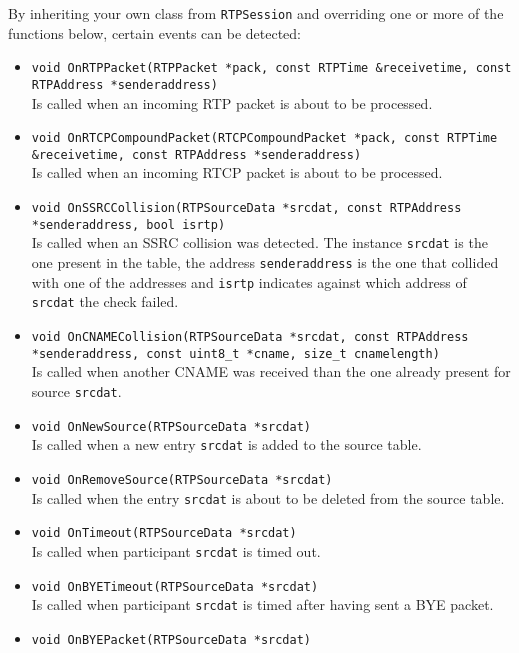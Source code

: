 \documentclass[12pt,a4paper]{article}
\begin{document}
				By inheriting your own class from {\tt RTPSession} and overriding
				one or more of the functions below, certain events can be detected:
				\begin{itemize}
					\item {\tt void OnRTPPacket(RTPPacket *pack, const RTPTime \&receivetime,
					                                    const RTPAddress *senderaddress)}\\
						Is called when an incoming RTP packet is about to be processed.
					\item {\tt void OnRTCPCompoundPacket(RTCPCompoundPacket *pack, const RTPTime \&receivetime,
					                                             const RTPAddress *senderaddress)}\\
						Is called when an incoming RTCP packet is about to be processed.
					\item {\tt void OnSSRCCollision(RTPSourceData *srcdat, const RTPAddress *senderaddress, bool isrtp)}\\
						Is called when an SSRC collision was detected. The instance
						{\tt srcdat} is the one present in the table, the address
						{\tt senderaddress} is the one that collided with one of the
						addresses and {\tt isrtp} indicates against which address of
						{\tt srcdat} the check failed.
					\item {\tt void OnCNAMECollision(RTPSourceData *srcdat, const RTPAddress *senderaddress,
					                                         const uint8\_t *cname, size\_t cnamelength)}\\
						Is called when another CNAME was received than the one
						already present for source {\tt srcdat}.
					\item {\tt void OnNewSource(RTPSourceData *srcdat)}\\
						Is called when a new entry {\tt srcdat} is added to the source
						table.
					\item {\tt void OnRemoveSource(RTPSourceData *srcdat)}\\
						Is called when the entry {\tt srcdat} is about to be
						deleted from the source table.
					\item {\tt void OnTimeout(RTPSourceData *srcdat)}\\
						Is called when participant {\tt srcdat} is timed out.
					\item {\tt void OnBYETimeout(RTPSourceData *srcdat)}\\
						Is called when participant {\tt srcdat} is timed after
						having sent a BYE packet.
					\item {\tt void OnBYEPacket(RTPSourceData *srcdat)}\\

\end{itemize}
\end{document}
